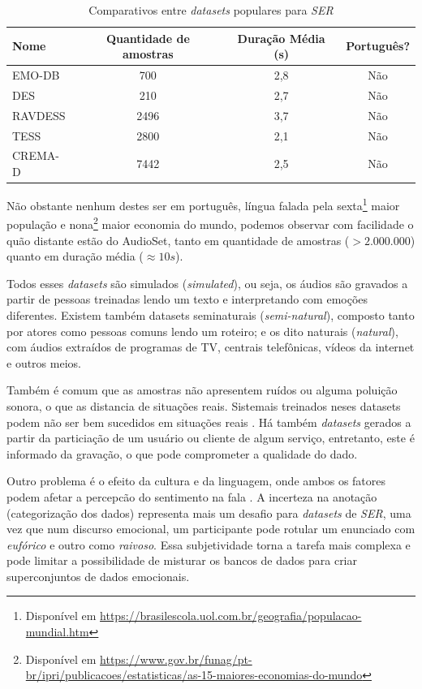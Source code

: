 \begin{table}[!ht]\label{table:comparativodbs}
\centering
\caption{Comparativos entre \textit{datasets} populares para \textit{SER}}
    \begin{tabular}{|l|c|c|c|}
    \hline
        Nome & Quantidade de amostras & Duração Média (s) & Português?  \\ \hline
        EMO-DB  & 700 & 2,8 & Não  \\ \hline
        DES  & 210 & 2,7 & Não  \\ \hline
        RAVDESS  & 2496 & 3,7 & Não  \\ \hline
        TESS  & 2800 & 2,1 & Não  \\ \hline
        CREMA-D  & 7442 & 2,5 & Não  \\ \hline
    \end{tabular}
\end{table}

Não obstante nenhum destes ser em português, língua falada pela sexta\footnote{Disponível em \url{https://brasilescola.uol.com.br/geografia/populacao-mundial.htm}} maior população e nona\footnote{Disponível em \url{https://www.gov.br/funag/pt-br/ipri/publicacoes/estatisticas/as-15-maiores-economias-do-mundo}} maior economia do mundo, podemos observar com facilidade o quão distante estão do AudioSet, tanto em quantidade de amostras ($> 2.000.000$) quanto em duração média ($\approx 10s$).

Todos esses \textit{datasets} são simulados (\textit{simulated}), ou seja, os áudios são gravados a partir de pessoas treinadas lendo um texto e interpretando com emoções diferentes. Existem também datasets seminaturais (\textit{semi-natural}), composto tanto por atores como pessoas comuns lendo um roteiro; e os dito naturais (\textit{natural}), com áudios extraídos de programas de TV, centrais telefônicas, vídeos da internet e outros meios.

Também é comum que as amostras não apresentem ruídos ou alguma poluição sonora, o que as distancia de situações reais. Sistemais treinados neses datasets podem não ser bem sucedidos em situações reais \cite{32}. Há também \textit{datasets} gerados a partir da particiação de um usuário ou cliente de algum serviço, entretanto, este é informado da gravação, o que pode comprometer a qualidade do dado.

Outro problema é o efeito da cultura e da linguagem, onde ambos os fatores podem afetar a percepcão do sentimento na fala \cite{32}. A incerteza na anotação (categorização dos dados) representa mais um desafio para \textit{datasets} de \textit{SER}, uma vez que num discurso emocional, um participante pode rotular um enunciado com \textit{eufórico} e outro como \textit{raivoso}. Essa subjetividade torna a tarefa mais complexa e pode limitar a possibilidade de misturar os bancos de dados para criar superconjuntos de dados emocionais.

